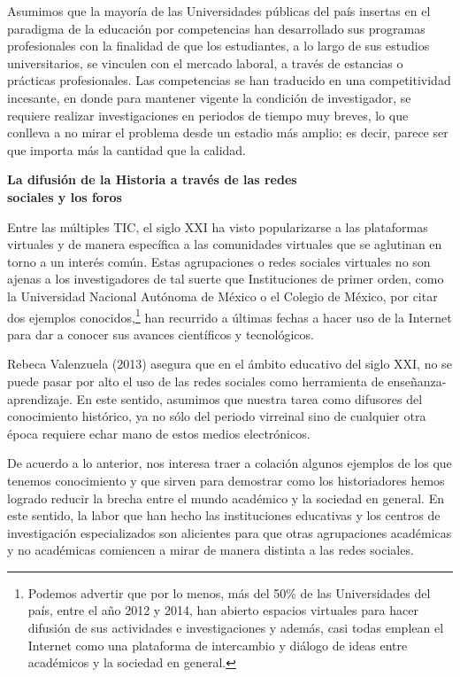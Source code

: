 Asumimos que  la mayoría de las Universidades públicas del país insertas en el
paradigma de la educación por competencias han desarrollado sus programas
profesionales con la finalidad de que los estudiantes, a lo largo de sus
estudios universitarios, se vinculen con el mercado laboral, a través de
estancias o prácticas profesionales. Las competencias se han traducido en una
competitividad incesante, en donde para mantener vigente la condición de
investigador, se requiere realizar investigaciones en periodos de tiempo muy
breves, lo que conlleva a no mirar el problema desde un estadio más amplio; es
decir, parece ser que importa más la cantidad que la calidad.
\newpage

\textbf{La difusión de la Historia a través de las redes\\ sociales y los foros}


Entre las múltiples TIC, el siglo XXI ha visto popularizarse a las plataformas
virtuales y de manera específica a las comunidades virtuales que se aglutinan
en torno a un interés común. Estas agrupaciones o redes sociales virtuales no
son ajenas a los investigadores de tal suerte que Instituciones de primer
orden, como la Universidad Nacional Autónoma de México o el Colegio de México,
por citar dos ejemplos conocidos,\footnote{Podemos advertir que por lo menos,
más del 50\% de las Universidades del país, entre el año 2012 y 2014, han
abierto espacios virtuales para hacer difusión de sus actividades e
investigaciones y además, casi todas emplean el Internet como una plataforma de
intercambio y diálogo de ideas entre académicos y la sociedad en general.} han
recurrido a últimas fechas a hacer uso de la Internet para dar a conocer sus
avances científicos y tecnológicos.


Rebeca Valenzuela (2013) asegura que en el ámbito educativo del siglo XXI, no se
puede pasar por alto el uso de las redes sociales como herramienta de
enseñanza-aprendizaje. En este sentido, asumimos que nuestra tarea como
difusores del conocimiento histórico, ya no sólo del periodo virreinal sino de
cualquier otra época requiere echar mano de estos medios electrónicos.


De acuerdo a lo anterior, nos interesa traer a colación algunos ejemplos de los
que tenemos conocimiento y que sirven para demostrar como los historiadores
hemos logrado reducir la brecha entre el mundo académico y la sociedad en
general. En este sentido, la labor que han hecho las instituciones educativas y
los centros de investigación especializados son alicientes para que otras
agrupaciones académicas y no académicas comiencen a mirar de manera distinta a
las redes sociales.


